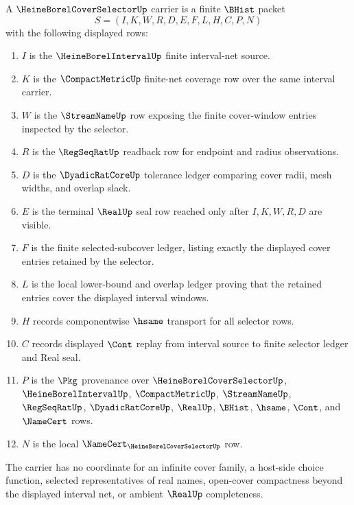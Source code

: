 \begin{definition}
\label{def:heine-borel-cover-selector-carrier}
A $\HeineBorelCoverSelectorUp$ carrier is a finite $\BHist$ packet
$$
S=(I,K,W,R,D,E,F,L,H,C,P,N)
$$
with the following displayed rows:
\begin{enumerate}
\item $I$ is the $\HeineBorelIntervalUp$ finite interval-net source.
\item $K$ is the $\CompactMetricUp$ finite-net coverage row over the same interval carrier.
\item $W$ is the $\StreamNameUp$ row exposing the finite cover-window entries inspected by the selector.
\item $R$ is the $\RegSeqRatUp$ readback row for endpoint and radius observations.
\item $D$ is the $\DyadicRatCoreUp$ tolerance ledger comparing cover radii, mesh widths, and overlap slack.
\item $E$ is the terminal $\RealUp$ seal row reached only after $I,K,W,R,D$ are visible.
\item $F$ is the finite selected-subcover ledger, listing exactly the displayed cover entries retained by the selector.
\item $L$ is the local lower-bound and overlap ledger proving that the retained entries cover the displayed interval windows.
\item $H$ records componentwise $\hsame$ transport for all selector rows.
\item $C$ records displayed $\Cont$ replay from interval source to finite selector ledger and Real seal.
\item $P$ is the $\Pkg$ provenance over $\HeineBorelCoverSelectorUp$, $\HeineBorelIntervalUp$, $\CompactMetricUp$, $\StreamNameUp$, $\RegSeqRatUp$, $\DyadicRatCoreUp$, $\RealUp$, $\BHist$, $\hsame$, $\Cont$, and $\NameCert$ rows.
\item $N$ is the local $\NameCert_{\HeineBorelCoverSelectorUp}$ row.
\end{enumerate}
The carrier has no coordinate for an infinite cover family, a host-side choice function, selected representatives of real names, open-cover compactness beyond the displayed interval net, or ambient $\RealUp$ completeness.
\end{definition}


